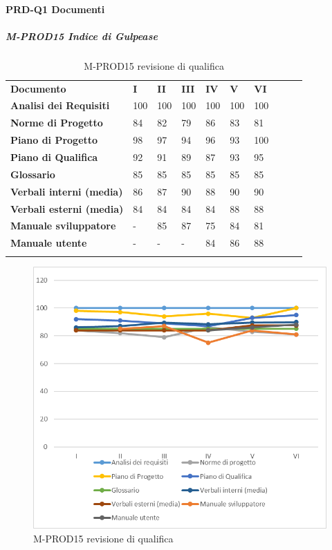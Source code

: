 \paragraph*{PRD-Q1 Documenti}
\subparagraph{M-PROD15 Indice di Gulpease}\mbox{}
\begin{longtable} {						
		>{}p{50mm}  		
		>{}p{8mm}		
		>{}p{8mm}		
		>{}p{8mm}		
		>{}p{8mm}		
		>{}p{8mm}		
		>{}p{8mm}
		>{}p{8mm}
		>{}p{8mm}
		>{}p{8mm}				
	}			
	\rowcolor{gray!50}
	\textbf{Documento} & \textbf{I} & \textbf{II} & \textbf{III} & \textbf{IV} & \textbf{V} & \textbf{VI} \TBstrut \\ [2mm]
	\textbf{Analisi dei Requisiti} & 100 & 100 & 100 & 100 & 100 & 100 \TBstrut \\ [2mm]
	\textbf{Norme di Progetto} & 84 & 82 & 79 & 86 & 83 & 81 \TBstrut \\ [2mm]
	\textbf{Piano di Progetto} & 98 & 97 & 94 & 96 & 93 & 100 \TBstrut \\ [2mm]
	\textbf{Piano di Qualifica} & 92 & 91 & 89 & 87 & 93 & 95 \TBstrut \\ [2mm]
	\textbf{Glossario} & 85 & 85 & 85 & 85 & 85 & 85 \TBstrut \\ [2mm]
	\textbf{Verbali interni (media)} & 86 & 87 & 90 & 88 & 90 & 90 \TBstrut \\ [2mm]
	\textbf{Verbali esterni (media)} & 84 & 84 & 84 & 84 & 88 & 88 \TBstrut \\ [2mm]
	\textbf{Manuale sviluppatore} & - & 85 & 87 & 75 & 84 & 81 \TBstrut \\ [2mm]
	\textbf{Manuale utente} & - & - & - & 84 & 86 & 88 \TBstrut \\ [2mm]
	\rowcolor{white}
	\caption{M-PROD15 revisione di qualifica}
\end{longtable}
\begin{figure}[H] 	
	\includegraphics[width=\linewidth]{./img/grafici/RQ15a.png}	
	\caption{M-PROD15 revisione di qualifica}	
\end{figure}
